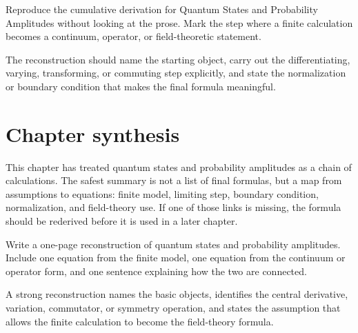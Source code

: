 \begin{exercise}
Reproduce the cumulative derivation for Quantum States and Probability Amplitudes without looking at the prose.  Mark the step where a finite calculation becomes a continuum, operator, or field-theoretic statement.
\begin{answer}
The reconstruction should name the starting object, carry out the differentiating, varying, transforming, or commuting step explicitly, and state the normalization or boundary condition that makes the final formula meaningful.
\end{answer}
\end{exercise}



\section{Chapter synthesis}

This chapter has treated quantum states and probability amplitudes as a chain of calculations.  The safest summary is not a list of final formulas, but a map from assumptions to equations: finite model, limiting step, boundary condition, normalization, and field-theory use.  If one of those links is missing, the formula should be rederived before it is used in a later chapter.

\begin{exercise}
Write a one-page reconstruction of quantum states and probability amplitudes.  Include one equation from the finite model, one equation from the continuum or operator form, and one sentence explaining how the two are connected.
\begin{answer}
A strong reconstruction names the basic objects, identifies the central derivative, variation, commutator, or symmetry operation, and states the assumption that allows the finite calculation to become the field-theory formula.
\end{answer}
\end{exercise}
